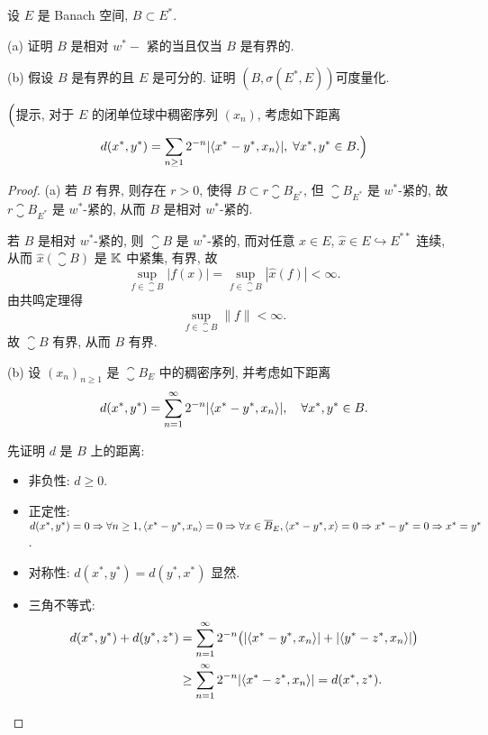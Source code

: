 \begin{exercise}
    设 $E$ 是 Banach 空间, $B\subset E^*$.

    (a) 证明 $B$ 是相对 $w^*-$ 紧的当且仅当 $B$ 是有界的.

    (b) 假设 $B$ 是有界的且 $E$ 是可分的. 证明 $(B, \sigma(E^*,E))$可度量化. 
    
    $\Bigl($提示, 对于 $E$ 的闭单位球中稠密序列 $(x_n)$, 考虑如下距离
    \[d(x^*, y^*) = \sum_{n\geq 1} 2^{-n}|\langle x^*-y^*,x_n\rangle|,\;\forall x^*,y^*\in B.\Bigr)\]
\end{exercise}

\begin{proof}
    (a) \sufficient 若 $B$ 有界, 则存在 $r>0$, 使得 $B\subset r\closure{B}_{E^*}$,
    但 $\closure{B}_{E^*}$ 是 $w^*$-紧的, 故 $r\closure{B}_{E^*}$ 是 $w^*$-紧的,
    从而 $B$ 是相对 $w^*$-紧的.

    \necessary
    若 $B$ 是相对 $w^*$-紧的, 则 $\closure{B}$ 是 $w^*$-紧的,
    而对任意 $x\in E$, $\hat{x}\in E\hookrightarrow E^{**}$ 连续,
    从而 $\hat{x}(\closure{B})$ 是 $\mathbb{K}$ 中紧集, 有界, 故
    \[\sup_{f\in\closure{B}}|f(x)|=\sup_{f\in\closure{B}}|\hat{x}(f)|<\infty.\]
    由共鸣定理得
    \[\sup_{f\in\closure{B}}\|f\|<\infty.\]
    故 $\closure{B}$ 有界, 从而 $B$ 有界.

    (b) 设 $(x_n)_{n\geq 1}$ 是 $\closure{B}_E$ 中的稠密序列, 并考虑如下距离
    \[d(x^*,y^*)=\sum_{n=1}^{\infty}2^{-n}|\langle x^*-y^*,x_n\rangle|,\quad\forall x^*,y^*\in B.\]

    先证明 $d$ 是 $B$ 上的距离:
    \begin{itemize}
        \item 非负性: $d\geq 0$.
        \item 正定性: $d(x^*,y^*)=0\Rightarrow\forall n\geq 1,\langle x^*-y^*,x_n\rangle=0\Rightarrow\forall x\in\overline{B}_E,\langle x^*-y^*,x\rangle=0\Rightarrow x^*-y^*=0\Rightarrow x^*=y^*$.
        \item 对称性: $d(x^*,y^*)=d(y^*,x^*)$ 显然.
        \item 三角不等式:
              \begin{align*}
                  d(x^*,y^*)+d(y^*,z^*)
                  & =\sum_{n=1}^{\infty}2^{-n}\bigl(|\langle x^*-y^*,x_n\rangle|+|\langle y^*-z^*,x_n\rangle|\bigr) \\
                  & \geq\sum_{n=1}^{\infty}2^{-n}|\langle x^*-z^*,x_n\rangle|=d(x^*,z^*).
              \end{align*}
    \end{itemize}


\end{proof}
